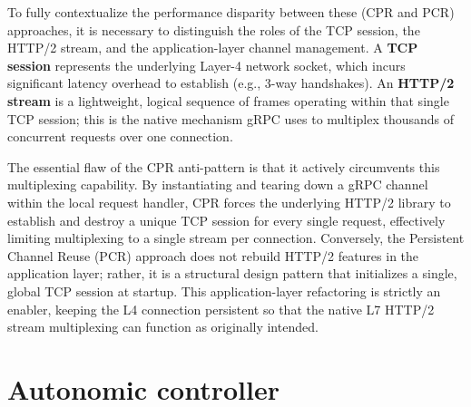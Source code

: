 \documentclass{ieeeaccess}
\begin{document}
To fully contextualize the performance disparity between these (CPR and PCR) approaches, it is necessary to distinguish the roles of the TCP session, the HTTP/2 stream, and the application-layer channel management. A \textbf{TCP session} represents the underlying Layer-4 network socket, which incurs significant latency overhead to establish (e.g., 3-way handshakes). An \textbf{HTTP/2 stream} is a lightweight, logical sequence of frames operating within that single TCP session; this is the native mechanism gRPC uses to multiplex thousands of concurrent requests over one connection. 

The essential flaw of the CPR anti-pattern is that it actively circumvents this multiplexing capability. By instantiating and tearing down a gRPC channel within the local request handler, CPR forces the underlying HTTP/2 library to establish and destroy a unique TCP session for every single request, effectively limiting multiplexing to a single stream per connection. Conversely, the Persistent Channel Reuse (PCR) approach does not rebuild HTTP/2 features in the application layer; rather, it is a structural design pattern that initializes a single, global TCP session at startup. This application-layer refactoring is strictly an enabler, keeping the L4 connection persistent so that the native L7 HTTP/2 stream multiplexing can function as originally intended.


\section{Autonomic controller}
\label{sec3}

\end{document}
